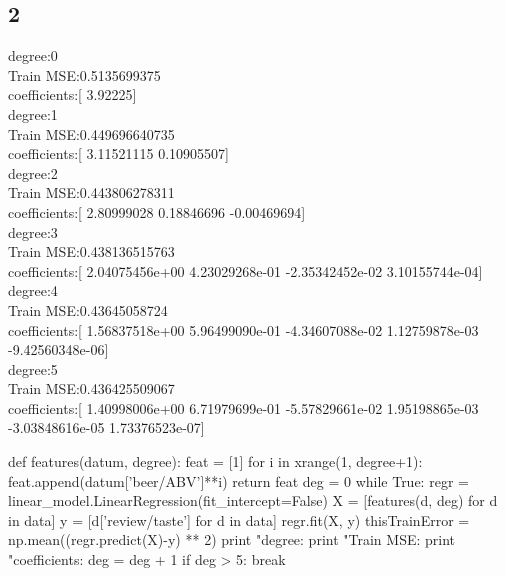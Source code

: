 \documentclass [11pt, a4paper, oneside] {article}
\begin{document}
\subsection *{2}
degree:0\\
Train MSE:0.5135699375\\
coefficients:[ 3.92225]\\
degree:1\\
Train MSE:0.449696640735\\
coefficients:[ 3.11521115  0.10905507]\\
degree:2\\
Train MSE:0.443806278311\\
coefficients:[ 2.80999028  0.18846696 -0.00469694]\\
degree:3\\
Train MSE:0.438136515763\\
coefficients:[  2.04075456e+00   4.23029268e-01  -2.35342452e-02   3.10155744e-04]\\
degree:4\\
Train MSE:0.43645058724\\
coefficients:[  1.56837518e+00   5.96499090e-01  -4.34607088e-02   1.12759878e-03
  -9.42560348e-06]\\
degree:5\\
Train MSE:0.436425509067\\
coefficients:[  1.40998006e+00   6.71979699e-01  -5.57829661e-02   1.95198865e-03
  -3.03848616e-05   1.73376523e-07]\\
\begin {python}
def features(datum, degree):
    feat = [1]
    for i in xrange(1, degree+1):
        feat.append(datum['beer/ABV']**i)
    return feat
deg = 0
while True:
    regr = linear_model.LinearRegression(fit_intercept=False)
    X = [features(d, deg) for d in data]
    y = [d['review/taste'] for d in data]
    regr.fit(X, y)
    thisTrainError = np.mean((regr.predict(X)-y) ** 2)
    print "degree:%
    print "Train MSE:%
    print "coefficients:%
    deg = deg + 1
    if deg > 5:
        break
\end{python}
\end{document}
